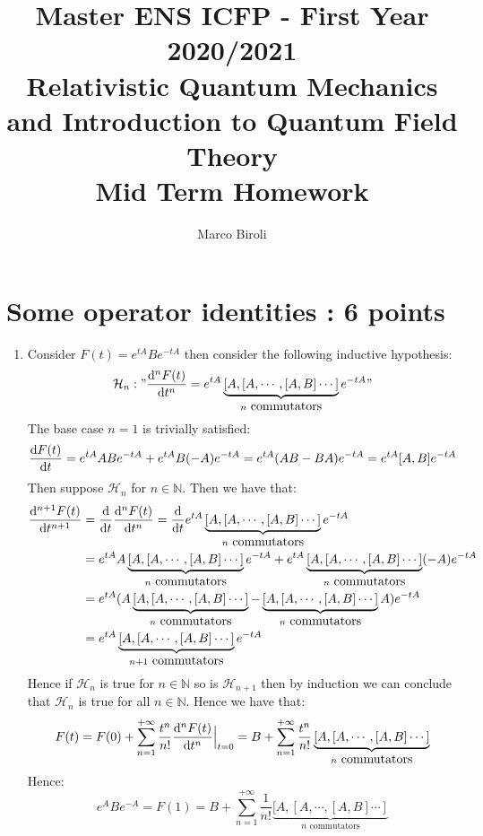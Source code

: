 \documentclass[10pt,a4paper]{article}
\author{Marco Biroli}
\title{Master ENS ICFP - First Year 2020/2021\\
Relativistic Quantum Mechanics and Introduction to Quantum Field Theory\\
Mid Term Homework}
\begin{document}
\maketitle

\section[Exercise]{Some operator identities : 6 points}

\begin{enumerate}

\item Consider $F(t) = e^{tA} B e^{-tA}$ then consider the following inductive hypothesis: 
\[\mathcal{H}_n : " \dv[n]{F(t)}{t} = e^{tA} \underbrace{[A, [A, \cdots, [A, B]\cdots]}_{n \mbox{~commutators}} e^{-tA} "\]
The base case $n= 1$ is trivially satisfied:
\[
\dv{F(t)}{t} = e^{tA} A B e^{-tA} + e^{tA} B (-A) e^{-tA} = e^{tA} (AB - BA) e^{-tA} = e^{tA}[A, B] e^{-tA}
\]
Then suppose $\mathcal{H}_n$ for $n \in \mathbb{N}$. Then we have that:
\begin{align*}
\dv[n+1]{F(t)}{t} &= \dv{}{t} \dv[n]{F(t)}{t} = \dv{}{t} e^{tA} \underbrace{[A, [A, \cdots, [A, B]\cdots]}_{n \mbox{~commutators}} e^{-t A } \\
&= e^{tA} A \underbrace{[A, [A, \cdots, [A, B]\cdots]}_{n \mbox{~commutators}} e^{-tA} + e^{tA} \underbrace{[A, [A, \cdots, [A, B]\cdots]}_{n \mbox{~commutators}} (-A) e^{-tA}\\
&= e^{tA} (A\underbrace{[A, [A, \cdots, [A, B]\cdots]}_{n \mbox{~commutators}} - \underbrace{[A, [A, \cdots, [A, B]\cdots]}_{n \mbox{~commutators}} A) e^{-tA}\\
&= e^{tA} \underbrace{[A, [A, \cdots, [A, B]\cdots]}_{n + 1 \mbox{~commutators}} e^{-tA}
\end{align*}
Hence if $\mathcal{H}_n$ is true for $n \in \mathbb{N}$ so is $\mathcal{H}_{n+1}$ then by induction we can conclude that $\mathcal{H}_n$ is true for all $n \in \mathbb{N}$. Hence we have that:
\[
F(t) = F(0) + \sum_{n = 1}^{+\infty} \frac{t^n}{n!} \dv[n]{F(t)}{t}\Big|_{t = 0} = B + \sum_{n = 1}^{+\infty} \frac{t^n}{n!} \underbrace{[A, [A, \cdots, [A, B]\cdots]}_{n \mbox{~commutators}}
\]
Hence:
\[
e^{A} B e^{-A} = F(1) = B + \sum_{n=1}^{+\infty} \frac{1}{n!} \underbrace{[A, [A, \cdots, [A, B]\cdots]}_{n \mbox{~commutators}}
\]


\end{enumerate}
\end{document}
